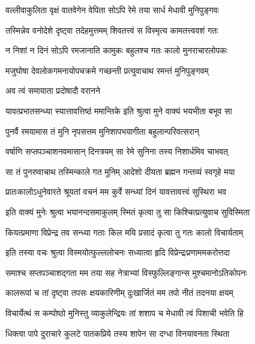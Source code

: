 \twolineshloka
{वल्लीवाकुलिता वृक्षं वातवेगेन वेपिता}
{सोऽपि रेमे तया सार्ध मेधावी मुनिपुङ्गवः} %

\twolineshloka
{तस्मिन्नेव वनोदेशे दृष्ट्वा तदेहमुत्तमम्}
{शिवतत्त्वं स विस्मृत्य कामतत्त्ववशं गतः} %

\twolineshloka
{न निशां न दिनं सोऽपि रमजानाति कामुकः}
{बहुलश्च गतः कालो मुनराचारलोपकः} %

\twolineshloka
{मजुघोषा देवलोकगमनायोपचक्रमे}
{गच्छन्ती प्रत्युवाचाथ रमन्तं मुनिपुङ्गवम्} %



\onelineshloka
{अव त्वं समायाता प्रदोषादौ वरानने} %

\twolineshloka
{यावत्प्रभातसन्ध्या स्यात्तावत्तिष्ठं ममान्तिके}
{इति श्रुत्वा मुने वाक्यं भयभीता बभूव सा} %

\twolineshloka
{पुनर्वै रमयामास तं मुनि नृपसत्तम}
{मुनिशापभयागीता बहुलान्परिवत्सरान्} %

\twolineshloka
{वर्षाणि सप्तपञ्चाशनवमासान् दिनत्रयम्}
{सा रेमे सुनिना तस्य निशार्धमिव चाभवत्} %

\twolineshloka
{सा तं पुनरुवाचाथ तस्मिन्काले गत मुनिम्}
{आदेशो दीयता ब्रह्मन गन्तव्यं स्वगृहे मया} %


\twolineshloka
{प्रातःकालोऽधुनेवारते श्रूयतां वचनं मम}
{कुर्वे सन्ध्यां दिनं यावत्तावत्त्वं सुस्थिरा भव} %

\twolineshloka
{इति वाक्यं मुनेः श्रुत्वा भयानन्दसमाकुलम्}
{स्मितं कृत्वा तु सा किश्चित्प्रत्युवाच सुविस्मिता} %


\twolineshloka
{कियत्प्रमाणा विप्रेन्द्र तव सन्ध्या गताः किल}
{मयि प्रसादं कृत्वा तु गतः कालो विचार्यताम्} %

\twolineshloka
{इति तस्या वचः श्रुत्वा विस्मयोत्फुल्ललोचनः}
{सध्यात्वा हृदि विप्रेन्द्रःप्रणाममकरोत्तदा} %

\twolineshloka
{समाश्च सप्तपञ्चाशद्गता मम तया सह}
{नेत्राभ्यां विस्फुल्लिङ्गान्स मुश्चमानोऽतिकोपनः} %

\twolineshloka
{कालरूपां च तां दृष्ट्वा तपसः क्षयकारिणीम्}
{दुःखार्जितं मम तपो नीतं तदनया क्षयम्} %

\twolineshloka
{विचार्येत्थं स कम्पोष्ठो मुनिस्तु व्याकुलेन्द्रियः}
{तां शशाप च मेधावी त्वं पिशाची भवेति हि} %

\twolineshloka
{धिक्त्वा पापे दुराचारे कुलटे पातकप्रिये}
{तस्य शापेन सा दग्धा विनयावनता स्थिता} %

